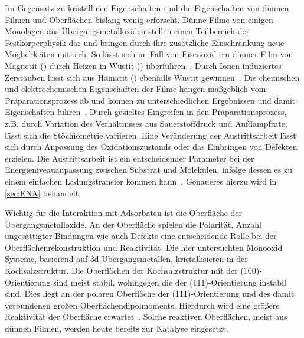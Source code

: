         Im Gegensatz zu kristallinen Eigenschaften sind die Eigenschaften von dünnen Filmen und Oberflächen bislang wenig erforscht.
        Dünne Filme von einigen Monolagen aus Übergangsmetalloxiden stellen einen Teilbereich der Festkörperphysik dar und bringen durch ihre zusätzliche Einschränkung neue Möglichkeiten mit sich.
        So lässt sich im Fall von Eisenoxid ein dünner Film von Magnetit () durch Heizen in Wüstit () überführen~\cite{FeO_1}.
        Durch Ionen induziertes Zerstäuben lässt sich aus Hämatit () ebenfalls Wüstit gewinnen~\cite{FeO_36}.
        Die chemischen und elektrochemischen Eigenschaften der Filme hängen maßgeblich vom Präparationsprozess ab und können zu unterschiedlichen Ergebnissen und damit Eigenschaften führen~\cite{Uni-Tübingen}.
        Durch gezieltes Eingreifen in den Präparationsprozess, z.B. durch Variation des Verhältnisses aus Sauerstoffdruck und Aufdampfrate, lässt sich die Stöchiometrie variieren.
        Eine Veränderung der Austrittsarbeit lässt sich durch Anpassung des Oxidationszustands oder das Einbringen von Defekten erzielen.
        Die Austrittsarbeit ist ein entscheidender Parameter bei der Energieniveauanpassung zwischen Substrat und Molekülen, infolge dessen es zu einem einfachen Ladungstransfer kommen kann~\cite{IF_3}.
        Genaueres hierzu wird in \autoref{sec:ENA} behandelt.

        Wichtig für die Interaktion mit Adsorbaten ist die Oberfläche der Übergangsmetalloxide.
        An der Oberfläche spielen die Polarität, Anzahl ungesättigter Bindungen wie auch Defekte eine entscheidende Rolle bei der Oberflächenrekonstruktion und Reaktivität.
        Die hier untersuchten Monooxid Systeme, basierend auf 3d-Übergangsmetallen, kristallisieren in der Kochsalzstruktur.
        Die Oberflächen der Kochsalzstruktur mit der (100)-Orientierung sind meist stabil, wohingegen die der (111)-Orientierung instabil sind.
        Dies liegt an der polaren Oberfläche der (111)-Orientierung und des damit verbundenen großen Oberflächendipolmoments.
        Hierdurch wird eine größere Reaktivität der Oberfläche erwartet~\cite{cappus_hydroxyl_1993}.
        Solche reaktiven Oberflächen, meist aus dünnen Filmen, werden heute bereits zur Katalyse eingesetzt.
    

